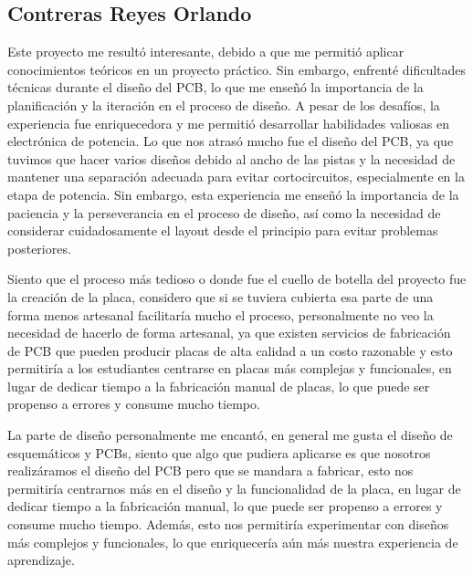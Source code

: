 \documentclass[12pt,a4paper]{article}
\begin{document}
\subsection*{Contreras Reyes Orlando}
Este proyecto me resultó interesante, debido a que me permitió aplicar conocimientos teóricos en un proyecto práctico. Sin embargo, enfrenté dificultades técnicas durante el diseño del PCB, lo que me enseñó la importancia de la planificación y la iteración en el proceso de diseño. A pesar de los desafíos, la experiencia fue enriquecedora y me permitió desarrollar habilidades valiosas en electrónica de potencia. Lo que nos atrasó mucho fue el diseño del PCB, ya que tuvimos que hacer varios diseños debido al ancho de las pistas y la necesidad de mantener una separación adecuada para evitar cortocircuitos, especialmente en la etapa de potencia. Sin embargo, esta experiencia me enseñó la importancia de la paciencia y la perseverancia en el proceso de diseño, así como la necesidad de considerar cuidadosamente el layout desde el principio para evitar problemas posteriores.


Siento que el proceso más tedioso o donde fue el cuello de botella del proyecto fue la creación de la placa, considero que si se tuviera cubierta esa parte de una forma menos artesanal facilitaría mucho el proceso, personalmente no veo la necesidad de hacerlo de forma artesanal, ya que existen servicios de fabricación de PCB que pueden producir placas de alta calidad a un costo razonable y esto permitiría a los estudiantes centrarse en placas más complejas y funcionales, en lugar de dedicar tiempo a la fabricación manual de placas, lo que puede ser propenso a errores y consume mucho tiempo.


La parte de diseño personalmente me encantó, en general me gusta el diseño de esquemáticos y PCBs, siento que algo que pudiera aplicarse es que nosotros realizáramos el diseño del PCB pero que se mandara a fabricar, esto nos permitiría centrarnos más en el diseño y la funcionalidad de la placa, en lugar de dedicar tiempo a la fabricación manual, lo que puede ser propenso a errores y consume mucho tiempo. Además, esto nos permitiría experimentar con diseños más complejos y funcionales, lo que enriquecería aún más nuestra experiencia de aprendizaje.
\newpage
\end{document}
